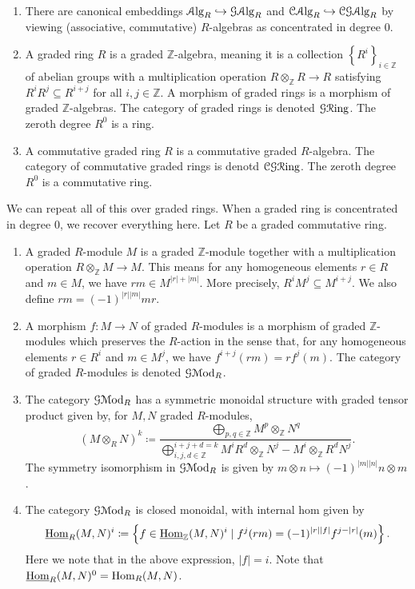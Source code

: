 \begin{enumerate}
	\item There are canonical embeddings $\mathcal{A}\mathrm{lg}_{R} \hookrightarrow \mathcal{G} \mathcal{A}\mathrm{lg}_{R} $ and $\mathcal{C} \mathcal{A}\mathrm{lg}_{R} \hookrightarrow \mathcal{C} \mathcal{G} \mathcal{A}\mathrm{lg}_{R} $ by viewing (associative, commutative) $R$-algebras as concentrated in degree 0.
	\item A graded ring $R$ is a graded $\mathbb{Z} $-algebra, meaning it is a collection $\left\{ R^i \right\} _{i\in\mathbb{Z} } $ of abelian groups with a multiplication operation $R\otimes _\mathbb{Z} R\to R$ satisfying $R^iR^j \subseteq R^{i+j} $ for all $i,j\in\mathbb{Z} $. A morphism of graded rings is a morphism of graded $\mathbb{Z} $-algebras. The category of graded rings is denoted $\mathcal{G} \mathcal{R}\mathrm{ing} $. The zeroth degree $R^0$ is a ring.
	\item A commutative graded ring $R$ is a commutative graded $R$-algebra. The category of commutative graded rings is denotd $\mathcal{C} \mathcal{G} \mathcal{R}\mathrm{ing} $. The zeroth degree $R^0$ is a commutative ring.
\end{enumerate}

We can repeat all of this over graded rings. When a graded ring is concentrated in degree 0, we recover everything here. Let $R$ be a graded commutative ring.

\begin{enumerate}
	\item A graded $R$-module $M$ is a graded $\mathbb{Z} $-module together with a multiplication operation $R\otimes _\mathbb{Z} M\to M$. This means for any homogeneous elements $r\in R$ and $m\in M$, we have $rm \in M^{\left| r \right| +\left| m \right| } $. More precisely, $R^iM^j \subseteq M^{i+j} $. We also define $rm = (-1)^{\left| r \right|\left| m \right|} mr$.
	\item A morphism $f : M \to N$ of graded $R$-modules is a morphism of graded $\mathbb{Z} $-modules which preserves the $R$-action in the sense that, for any homogeneous elements $r\in R^i$ and $m\in M^j$, we have $f^{i+j} (rm)=rf^j(m)$. The category of graded $R$-modules is denoted $\mathcal{G} \mathcal{M}\mathrm{od} _R$.
	\item The category $\mathcal{G} \mathcal{M}\mathrm{od} _R$ has a symmetric monoidal structure with graded tensor product given by, for $M,N$ graded $R$-modules,
		\[
			\left( M\otimes _RN \right) ^k \coloneqq \frac{\displaystyle{\bigoplus_{p,q\in\mathbb{Z} }M^p\otimes _\mathbb{Z} N^q}}{\displaystyle{\bigoplus_{i,j,d\in\mathbb{Z} } ^{i+j+d=k} M^iR^d\otimes_\mathbb{Z} N^j - M^i \otimes_\mathbb{Z}  R^dN^j}} 
		.\]
		The symmetry isomorphism in $\mathcal{G} \mathcal{M}\mathrm{od} _R$ is given by $m\otimes n\mapsto (-1)^{\left| m \right| \left| n \right| } n\otimes m$.
	\item The category $\mathcal{G} \mathcal{M}\mathrm{od} _R$ is closed monoidal, with internal hom given by
		\[
			\underline{\operatorname{Hom}}_R(M,N)^i \coloneqq \left\{ f\in \underline{\operatorname{Hom}}_\mathbb{Z} (M,N)^i \mid f^j(rm) = (-1)^{\left| r \right| \left| f \right| } f^{j-\left| r \right| } (m) \right\} 
		.\]
		Here we note that in the above expression, $\left| f \right| =i$. Note that $\underline{\operatorname{Hom}}_R(M,N)^0 = \operatorname{Hom}_{R}(M, N) $.
\end{enumerate}

